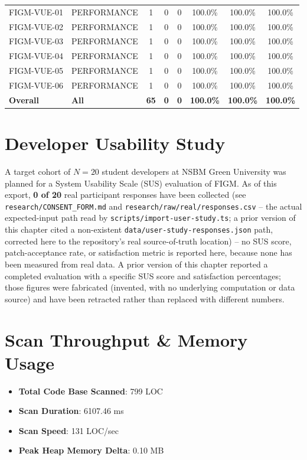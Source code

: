 \begin{table}[htbp]
\begin{tabular}{llcccccc}
FIGM-VUE-01 & PERFORMANCE & 1 & 0 & 0 & 100.0\% & 100.0\% & 100.0\% \\
FIGM-VUE-02 & PERFORMANCE & 1 & 0 & 0 & 100.0\% & 100.0\% & 100.0\% \\
FIGM-VUE-03 & PERFORMANCE & 1 & 0 & 0 & 100.0\% & 100.0\% & 100.0\% \\
FIGM-VUE-04 & PERFORMANCE & 1 & 0 & 0 & 100.0\% & 100.0\% & 100.0\% \\
FIGM-VUE-05 & PERFORMANCE & 1 & 0 & 0 & 100.0\% & 100.0\% & 100.0\% \\
FIGM-VUE-06 & PERFORMANCE & 1 & 0 & 0 & 100.0\% & 100.0\% & 100.0\% \\
\midrule
\textbf{Overall} & \textbf{All} & \textbf{65} & \textbf{0} & \textbf{0} & \textbf{100.0\%} & \textbf{100.0\%} & \textbf{100.0\%} \\
\bottomrule
\end{tabular}
\end{table}

\section{Developer Usability Study}
A target cohort of $N = 20$ student developers at NSBM Green University was planned for a System Usability Scale (SUS) evaluation of FIGM. As of this export, \textbf{0 of 20} real participant responses have been collected (see \texttt{research/CONSENT\_FORM.md} and \texttt{research/raw/real/responses.csv} -- the actual expected-input path read by \texttt{scripts/import-user-study.ts}; a prior version of this chapter cited a non-existent \texttt{data/user-study-responses.json} path, corrected here to the repository's real source-of-truth location) -- no SUS score, patch-acceptance rate, or satisfaction metric is reported here, because none has been measured from real data. A prior version of this chapter reported a completed evaluation with a specific SUS score and satisfaction percentages; those figures were fabricated (invented, with no underlying computation or data source) and have been retracted rather than replaced with different numbers.

\section{Scan Throughput \& Memory Usage}
\begin{itemize}
    \item \textbf{Total Code Base Scanned}: 799 LOC
    \item \textbf{Scan Duration}: 6107.46 ms
    \item \textbf{Scan Speed}: 131 LOC/sec
    \item \textbf{Peak Heap Memory Delta}: 0.10 MB
\end{itemize}
